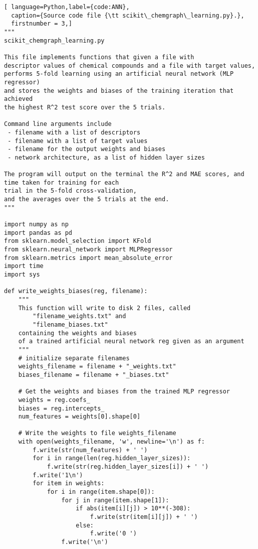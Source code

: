 \documentclass[11pt,titlepage,dvipdfmx,twoside]{article}
\begin{document}
\begin{lstlisting}[ language=Python,label={code:ANN},
  caption={Source code file {\tt scikit\_chemgraph\_learning.py}.},
  firstnumber = 3,]
"""
scikit_chemgraph_learning.py

This file implements functions that given a file with
descriptor values of chemical compounds and a file with target values,
performs 5-fold learning using an artificial neural network (MLP regressor)
and stores the weights and biases of the training iteration that achieved
the highest R^2 test score over the 5 trials. 

Command line arguments include
 - filename with a list of descriptors
 - filename with a list of target values
 - filename for the output weights and biases
 - network architecture, as a list of hidden layer sizes
 
The program will output on the terminal the R^2 and MAE scores, and
time taken for training for each 
trial in the 5-fold cross-validation, 
and the averages over the 5 trials at the end.
"""

import numpy as np
import pandas as pd
from sklearn.model_selection import KFold
from sklearn.neural_network import MLPRegressor
from sklearn.metrics import mean_absolute_error
import time
import sys

def write_weights_biases(reg, filename):
    """ 
    This function will write to disk 2 files, called
        "filename_weights.txt" and
        "filename_biases.txt"
    containing the weights and biases 
    of a trained artificial neural network reg given as an argument
    """
    # initialize separate filenames
    weights_filename = filename + "_weights.txt"
    biases_filename = filename + "_biases.txt"
    
    # Get the weights and biases from the trained MLP regressor
    weights = reg.coefs_
    biases = reg.intercepts_
    num_features = weights[0].shape[0]
    
    # Write the weights to file weights_filename
    with open(weights_filename, 'w', newline='\n') as f:
        f.write(str(num_features) + ' ')
        for i in range(len(reg.hidden_layer_sizes)):
            f.write(str(reg.hidden_layer_sizes[i]) + ' ')
        f.write('1\n')
        for item in weights:
            for i in range(item.shape[0]):
                for j in range(item.shape[1]):
                    if abs(item[i][j]) > 10**(-308):
                        f.write(str(item[i][j]) + ' ')
                    else:
                        f.write('0 ')
                f.write('\n')
    

\end{lstlisting}
\end{document}
